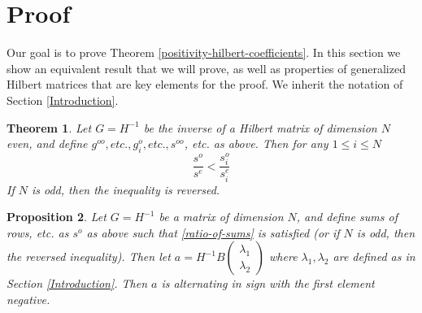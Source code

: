 \documentclass[11pt]{article}
\newtheorem{thm}{Theorem}[section]
\newtheorem{prop}[thm]{Proposition}
\theoremstyle{definition}
\theoremstyle{remark}
\numberwithin{equation}{section}
\begin{document}
\section{Proof} 

Our goal is to prove Theorem \ref{positivity-hilbert-coefficients}. In this section we show an equivalent result that we will prove, as well as properties of generalized Hilbert matrices that are key elements for the proof. We inherit the notation of Section \ref{Introduction}.

\begin{thm}\label{ratio-of-sums-equivalent-theorem}
Let $G=H^{-1}$ be the inverse of a Hilbert matrix of dimension $N$ even, and define $g^{oo}, etc., g^{o}_i, etc., s^{oo}$, etc. as above. Then for any $1 \le i \le N$
\begin{equation}\label{ratio-of-sums}
\frac{s^o}{s^e} < \frac{s_i^o}{s_i^e}
\end{equation} If $N$ is odd, then the inequality is reversed. 
\end{thm}

\begin{prop}\label{ratio-of-sums-is-equivalent-to-positivity-of-coefficients}
Let $G=H^{-1}$ be a matrix of dimension $N$, and define sums of rows, etc. as $s^{o}$ as above such that \ref{ratio-of-sums} is satisfied (or if $N$ is odd, then the reversed inequality). Then let $a = H^{-1} B \begin{pmatrix} \lambda_1 \\ \lambda_2 \end{pmatrix}$ where $\lambda_1, \lambda_2$ are defined as in Section \ref{Introduction}. Then $a$ is alternating in sign with the first element negative. 
\end{prop}
\end{document}

